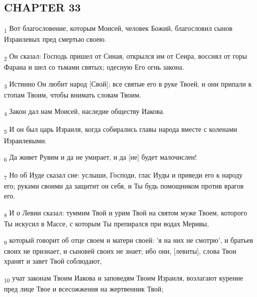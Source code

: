 \subsection{CHAPTER 33}
\begin{tcolorbox}
\textsubscript{1} Вот благословение, которым Моисей, человек Божий, благословил сынов Израилевых пред смертью своею.
\end{tcolorbox}
\begin{tcolorbox}
\textsubscript{2} Он сказал: Господь пришел от Синая, открылся им от Сеира, воссиял от горы Фарана и шел со тьмами святых; одесную Его огнь закона.
\end{tcolorbox}
\begin{tcolorbox}
\textsubscript{3} Истинно Он любит народ [Свой]; все святые его в руке Твоей, и они припали к стопам Твоим, чтобы внимать словам Твоим.
\end{tcolorbox}
\begin{tcolorbox}
\textsubscript{4} Закон дал нам Моисей, наследие обществу Иакова.
\end{tcolorbox}
\begin{tcolorbox}
\textsubscript{5} И он был царь Израиля, когда собирались главы народа вместе с коленами Израилевыми.
\end{tcolorbox}
\begin{tcolorbox}
\textsubscript{6} Да живет Рувим и да не умирает, и да [не] будет малочислен!
\end{tcolorbox}
\begin{tcolorbox}
\textsubscript{7} Но об Иуде сказал сие: услыши, Господи, глас Иуды и приведи его к народу его; руками своими да защитит он себя, и Ты будь помощником против врагов его.
\end{tcolorbox}
\begin{tcolorbox}
\textsubscript{8} И о Левии сказал: туммим Твой и урим Твой на святом муже Твоем, которого Ты искусил в Массе, с которым Ты препирался при водах Меривы,
\end{tcolorbox}
\begin{tcolorbox}
\textsubscript{9} который говорит об отце своем и матери своей: 'я на них не смотрю', и братьев своих не признает, и сыновей своих не знает; ибо они, [левиты], слова Твои хранят и завет Твой соблюдают,
\end{tcolorbox}
\begin{tcolorbox}
\textsubscript{10} учат законам Твоим Иакова и заповедям Твоим Израиля, возлагают курение пред лице Твое и всесожжения на жертвенник Твой;
\end{tcolorbox}
